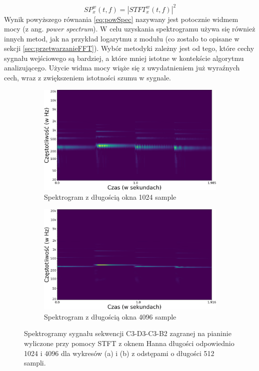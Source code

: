 \documentclass[12pt,a4paper,twoside]{mwart}
\begin{document}
\begin{equation} \label{eq:powSpec}
  SP_x^w(t,f) = |STFT_x^w(t,f)|^2
\end{equation} 
Wynik powyższego równania \ref{eq:powSpec} nazywany jest potocznie widmem mocy (z ang. \textit{power spectrum}). W celu uzyskania spektrogramu używa się również innych metod, jak na przykład logarytmu z modułu (co zostało to opisane w sekcji \ref{sec:przetwarzanieFFT}). Wybór metodyki zależny jest od tego, które cechy sygnału wejściowego są bardziej, a które mniej istotne w kontekście algorytmu analizującego. Użycie widma mocy wiąże się z uwydatnieniem już wyraźnych cech, wraz z zwiększeniem istotności szumu w sygnale.

\begin{figure}[t]
  \begin{subfigure}{.49\textwidth}
    \centering
    \includegraphics[width=1.\linewidth]{images/Spectrogram/spectrogram_1024_cropped.jpg}
    \caption{Spektrogram z długością okna 1024 sample}
  \end{subfigure}
  \begin{subfigure}{.5\textwidth}
    \centering
    \includegraphics[width=1.\linewidth]{images/Spectrogram/spectrogram_4096_cropped.jpg}
    \caption{Spektrogram z długością okna 4096 sample}
  \end{subfigure}
  \caption{Spektrogramy sygnału sekwencji C3-D3-C3-B2 zagranej na pianinie wyliczone przy pomocy STFT z oknem Hanna długości odpowiednio 1024 i 4096 dla wykresów (a) i (b) z odstępami o długości 512 sampli.}
  \label{fig:windowSize}
\end{figure}
\end{document}
